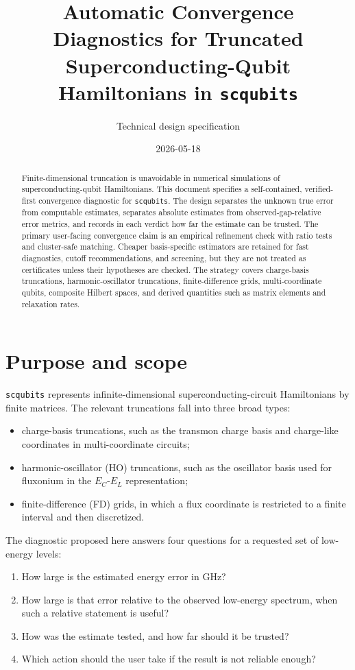 \documentclass[11pt,a4paper]{article}
\title{Automatic Convergence Diagnostics for Truncated Superconducting-Qubit Hamiltonians in \texttt{scqubits}}
\author{Technical design specification}
\date{2026-05-18}
\begin{document}
\maketitle

\begin{abstract}
Finite-dimensional truncation is unavoidable in numerical simulations of superconducting-qubit Hamiltonians.  This document specifies a self-contained, verified-first convergence diagnostic for \texttt{scqubits}.  The design separates the unknown true error from computable estimates, separates absolute estimates from observed-gap-relative error metrics, and records in each verdict how far the estimate can be trusted.  The primary user-facing convergence claim is an empirical refinement check with ratio tests and cluster-safe matching.  Cheaper basis-specific estimators are retained for fast diagnostics, cutoff recommendations, and screening, but they are not treated as certificates unless their hypotheses are checked.  The strategy covers charge-basis truncations, harmonic-oscillator truncations, finite-difference grids, multi-coordinate qubits, composite Hilbert spaces, and derived quantities such as matrix elements and relaxation rates.
\end{abstract}

\tableofcontents
\newpage

\section{Purpose and scope}

\texttt{scqubits} represents infinite-dimensional superconducting-circuit Hamiltonians by finite matrices.  The relevant truncations fall into three broad types:
\begin{itemize}
\item charge-basis truncations, such as the transmon charge basis and charge-like coordinates in multi-coordinate circuits;
\item harmonic-oscillator (HO) truncations, such as the oscillator basis used for fluxonium in the $E_C$-$E_L$ representation;
\item finite-difference (FD) grids, in which a flux coordinate is restricted to a finite interval and then discretized.
\end{itemize}

The diagnostic proposed here answers four questions for a requested set of low-energy levels:
\begin{enumerate}
\item How large is the estimated energy error in GHz?
\item How large is that error relative to the observed low-energy spectrum, when such a relative statement is useful?
\item How was the estimate tested, and how far should it be trusted?
\item Which action should the user take if the result is not reliable enough?
\end{enumerate}
\end{document}
